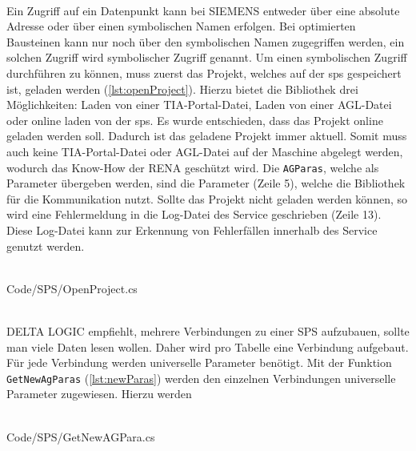 \ \\
Ein Zugriff auf ein Datenpunkt kann bei SIEMENS entweder über eine absolute Adresse oder über einen symbolischen Namen erfolgen. Bei optimierten Bausteinen kann nur noch über den symbolischen Namen zugegriffen werden, ein solchen Zugriff wird \glqq symbolischer Zugriff\grqq{} genannt.
Um einen symbolischen Zugriff durchführen zu können, muss zuerst das Projekt, welches auf der \ac{sps} gespeichert ist, geladen werden (\autoref{lst:openProject}). Hierzu bietet die Bibliothek drei Möglichkeiten: Laden von einer TIA-Portal-Datei, Laden von einer AGL-Datei oder online laden von der \ac{sps}. Es wurde entschieden, dass das Projekt online geladen werden soll. Dadurch ist das geladene Projekt immer aktuell. Somit muss auch keine TIA-Portal-Datei oder AGL-Datei auf der Maschine abgelegt werden, wodurch das Know-How der RENA geschützt wird. Die \texttt{AGParas}, welche als  Parameter übergeben werden, sind die Parameter (Zeile 5), welche die Bibliothek für die Kommunikation nutzt. Sollte das Projekt nicht geladen werden können, so wird eine Fehlermeldung in die Log-Datei des Service geschrieben (Zeile 13). Diese Log-Datei kann zur Erkennung von Fehlerfällen innerhalb des Service genutzt werden. 
\ \\
\begin{minipage}{\textwidth}
\ \\
 {Code/SPS/OpenProject.cs}
\ \\
\end{minipage}
\ \\
DELTA LOGIC empfiehlt, mehrere Verbindungen zu einer SPS aufzubauen, sollte man viele Daten lesen wollen. Daher wird pro Tabelle eine Verbindung aufgebaut. Für jede Verbindung werden  universelle Parameter benötigt. Mit der Funktion \texttt{GetNewAgParas} (\autoref{lst:newParas}) werden den einzelnen Verbindungen universelle Parameter zugewiesen. Hierzu werden 
\ \\
\begin{minipage}{\textwidth}
\ \\
 {Code/SPS/GetNewAGPara.cs}
\ \\
\end{minipage}

